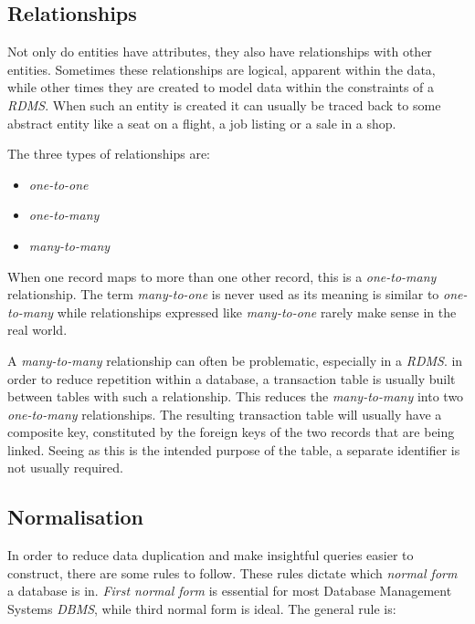 \documentclass[10pt]{article}
\begin{document}
\subsection{Relationships}
\label{sec:orga469848}

Not only do entities have attributes, they also have relationships with other entities. Sometimes these relationships are logical, apparent within the data, while other times they are created to model data within the constraints of a \emph{RDMS}. When such an entity is created it can usually be traced back to some abstract entity like a seat on a flight, a job listing or a sale in a shop.

The three types of relationships are:

\begin{itemize}
\item \emph{one-to-one}
\item \emph{one-to-many}
\item \emph{many-to-many}
\end{itemize}

When one record maps to more than one other record, this is a \emph{one-to-many} relationship. The term \emph{many-to-one} is never used as its meaning is similar to \emph{one-to-many} while relationships expressed like \emph{many-to-one} rarely make sense in the real world.

A \emph{many-to-many} relationship can often be problematic, especially in a \emph{RDMS}. in order to reduce repetition within a database, a transaction table is usually built between tables with such a relationship. This reduces the \emph{many-to-many} into two \emph{one-to-many} relationships. The resulting transaction table will usually have a composite key, constituted by the foreign keys of the two records that are being linked. Seeing as this is the intended purpose of the table, a separate identifier is not usually required.

\subsection{Normalisation}
\label{sec:orge41fcb6}

In order to reduce data duplication and make insightful queries easier to construct, there are some rules to follow. These rules dictate which \emph{normal form} a database is in. \emph{First normal form} is essential for most Database Management Systems \emph{DBMS}, while third normal form is ideal. The general rule is:
\end{document}
